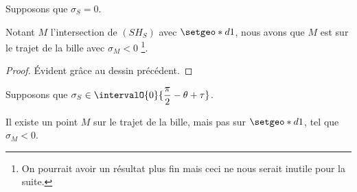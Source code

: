 \begin{fact} \label{ortho-rebond}
	Supposons que $\sigma_S = 0$.
	
	\medskip
	
	Notant $M$ l'intersection de $(SH_S)$ avec $\setgeo*{d}{1}$, nous avons que $M$ est sur le trajet de la bille avec $\sigma_M < 0$
	\footnote{
		On pourrait avoir un résultat plus fin mais ceci ne nous serait inutile pour la suite.
	}.
\end{fact}

\begin{proof}
	Évident grâce au dessin précédent.
\end{proof}


\medskip


\begin{fact} \label{deux-rebonds-vers-F}
	Supposons que $\sigma_S \in \intervalO{0}{\dfrac{\pi}{2} - \theta + \tau}$.
	
	\medskip
	
	Il existe un point $M$ sur le trajet de la bille, mais pas sur $\setgeo*{d}{1}$, tel que $\sigma_M  < 0$.
\end{fact}

